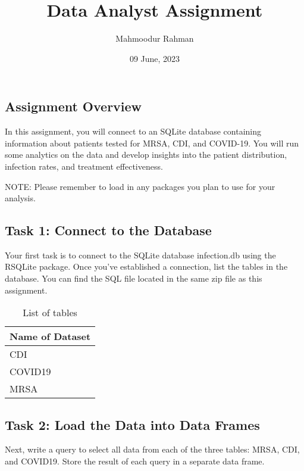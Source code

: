 \documentclass[
]{article}
\title{Data Analyst Assignment}
\author{Mahmoodur Rahman}
\date{09 June, 2023}
\begin{document}
\maketitle

\hypertarget{assignment-overview}{%
\subsection{Assignment Overview}\label{assignment-overview}}

In this assignment, you will connect to an SQLite database containing
information about patients tested for MRSA, CDI, and COVID-19. You will
run some analytics on the data and develop insights into the patient
distribution, infection rates, and treatment effectiveness.

NOTE: Please remember to load in any packages you plan to use for your
analysis.

\hypertarget{task-1-connect-to-the-database}{%
\subsection{Task 1: Connect to the
Database}\label{task-1-connect-to-the-database}}

Your first task is to connect to the SQLite database infection.db using
the RSQLite package. Once you've established a connection, list the
tables in the database. You can find the SQL file located in the same
zip file as this assignment.

\begin{table}[!h]

\caption{\label{tab:task ONE}List of tables}
\centering
\begin{tabular}[t]{l}
\hline
Name of Dataset\\
\hline
CDI\\
\hline
COVID19\\
\hline
MRSA\\
\hline
\end{tabular}
\end{table}

\hypertarget{task-2-load-the-data-into-data-frames}{%
\subsection{Task 2: Load the Data into Data
Frames}\label{task-2-load-the-data-into-data-frames}}

Next, write a query to select all data from each of the three tables:
MRSA, CDI, and COVID19. Store the result of each query in a separate
data frame.
\end{document}
